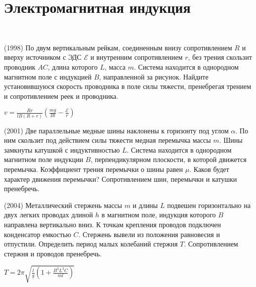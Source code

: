 \section{Электромагнитная индукция}

\begin{ex}
\hspace{0pt} \\
\begin{minipage}{.65\textwidth}
(1998) По двум вертикальным рейкам, соединенным внизу сопротивлением $R$ и вверху источником с ЭДС $\mathcal{E}$ и внутренним сопротивлением $r$, без трения скользит проводник $AC$, длина которого $L$, масса $m$. 
Система находится в однородном магнитном поле с индукцией $B$, направленной за рисунок. 
Найдите установившуюся скорость проводника в поле силы тяжести, пренебрегая трением и сопротивлением реек и проводника.
\end{minipage}
\begin{minipage}{.35\textwidth}
\centering

\end{minipage}
\begin{ans}
$v = \frac{Rr}{lB(R+r)}\left( \frac{mg}{Bl} - \frac{\mathcal{E}}{r} \right)$
\end{ans}
\end{ex}

\begin{ex}
(2001) Две параллельные медные шины наклонены к горизонту под углом  $\alpha$. 
По ним скользит под действием силы тяжести медная перемычка массы $m$. Шины замкнуты катушкой с индуктивностью $L$. 
Система находится в однородном магнитном поле индукции $B$, перпендикулярном плоскости, в которой движется перемычка. 
Коэффициент трения перемычки о шины равен $\mu$. Каков будет характер движения перемычки? Сопротивлением шин, перемычки и катушки пренебречь.
\end{ex}

\begin{ex}
(2004) Металлический стержень массы $m$ и длины $L$ подвешен горизонтально на двух легких проводах длиной $h$ в магнитном поле, 
индукция которого $B$ направлена вертикально вниз. К точкам крепления проводов подключен конденсатор емкостью $C$. 
Стержень вывели из положения равновесия и отпустили. Определить период малых колебаний стержня $T$. Сопротивлением стержня и проводов пренебречь.
\begin{ans}
$T = 2\pi \sqrt{\frac{l}{g} \left( 1 + \frac{B^2L^2C}{ml} \right)}$
\end{ans}
\end{ex}


